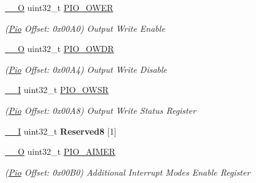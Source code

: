 \begin{DoxyCompactItemize}
\item 
\mbox{\label{structPio_a3f107ed12ab129415adff964505726a8}} 
\mbox{\hyperlink{core__cm7_8h_a7e25d9380f9ef903923964322e71f2f6}{\+\_\+\+\_\+O}} uint32\+\_\+t \mbox{\hyperlink{structPio_a3f107ed12ab129415adff964505726a8}{P\+I\+O\+\_\+\+O\+W\+ER}}
\begin{DoxyCompactList}\small\item\em (\mbox{\hyperlink{structPio}{Pio}} Offset\+: 0x00\+A0) Output Write Enable \end{DoxyCompactList}\item 
\mbox{\label{structPio_a4a6e4d45fdcd6722464de204f857ed5a}} 
\mbox{\hyperlink{core__cm7_8h_a7e25d9380f9ef903923964322e71f2f6}{\+\_\+\+\_\+O}} uint32\+\_\+t \mbox{\hyperlink{structPio_a4a6e4d45fdcd6722464de204f857ed5a}{P\+I\+O\+\_\+\+O\+W\+DR}}
\begin{DoxyCompactList}\small\item\em (\mbox{\hyperlink{structPio}{Pio}} Offset\+: 0x00\+A4) Output Write Disable \end{DoxyCompactList}\item 
\mbox{\label{structPio_ab9fc12aa7c792d7f537523b02869ae85}} 
\mbox{\hyperlink{core__cm7_8h_af63697ed9952cc71e1225efe205f6cd3}{\+\_\+\+\_\+I}} uint32\+\_\+t \mbox{\hyperlink{structPio_ab9fc12aa7c792d7f537523b02869ae85}{P\+I\+O\+\_\+\+O\+W\+SR}}
\begin{DoxyCompactList}\small\item\em (\mbox{\hyperlink{structPio}{Pio}} Offset\+: 0x00\+A8) Output Write Status Register \end{DoxyCompactList}\item 
\mbox{\label{structPio_a2007dd6634481af38d6b6408eb7d8d06}} 
\mbox{\hyperlink{core__cm7_8h_af63697ed9952cc71e1225efe205f6cd3}{\+\_\+\+\_\+I}} uint32\+\_\+t {\bfseries Reserved8} \mbox{[}1\mbox{]}
\item 
\mbox{\label{structPio_a5bc2d24607b0a995819aa5f294b64348}} 
\mbox{\hyperlink{core__cm7_8h_a7e25d9380f9ef903923964322e71f2f6}{\+\_\+\+\_\+O}} uint32\+\_\+t \mbox{\hyperlink{structPio_a5bc2d24607b0a995819aa5f294b64348}{P\+I\+O\+\_\+\+A\+I\+M\+ER}}
\begin{DoxyCompactList}\small\item\em (\mbox{\hyperlink{structPio}{Pio}} Offset\+: 0x00\+B0) Additional Interrupt Modes Enable Register \end{DoxyCompactList}\item 

\end{DoxyCompactItemize}
